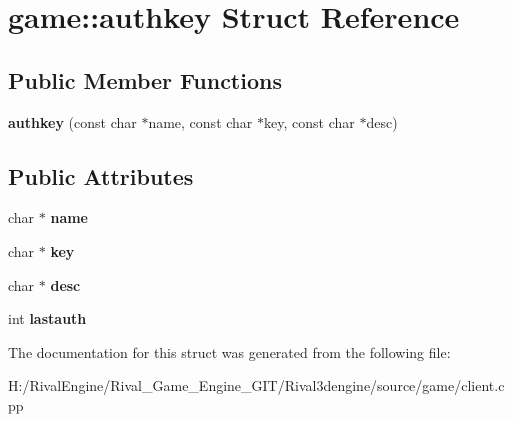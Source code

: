 \hypertarget{structgame_1_1authkey}{}\section{game\+:\+:authkey Struct Reference}
\label{structgame_1_1authkey}
\subsection*{Public Member Functions}
\begin{DoxyCompactItemize}
\item 
\mbox{\label{structgame_1_1authkey_afcd8afc6003246903d5f50a6ff20ff8c}} 
{\bfseries authkey} (const char $\ast$name, const char $\ast$key, const char $\ast$desc)
\end{DoxyCompactItemize}
\subsection*{Public Attributes}
\begin{DoxyCompactItemize}
\item 
\mbox{\label{structgame_1_1authkey_ae1246d295a2d8a2218bfb95d27fadac5}} 
char $\ast$ {\bfseries name}
\item 
\mbox{\label{structgame_1_1authkey_aff1448047426038c01e5bac8742c1d9b}} 
char $\ast$ {\bfseries key}
\item 
\mbox{\label{structgame_1_1authkey_ae7093f596536f31dbe6ff3baa267261a}} 
char $\ast$ {\bfseries desc}
\item 
\mbox{\label{structgame_1_1authkey_a6bb87f4780219bb49aad6802a7612081}} 
int {\bfseries lastauth}
\end{DoxyCompactItemize}


The documentation for this struct was generated from the following file\+:\begin{DoxyCompactItemize}
\item 
H\+:/\+Rival\+Engine/\+Rival\+\_\+\+Game\+\_\+\+Engine\+\_\+\+G\+I\+T/\+Rival3dengine/source/game/client.\+cpp\end{DoxyCompactItemize}
